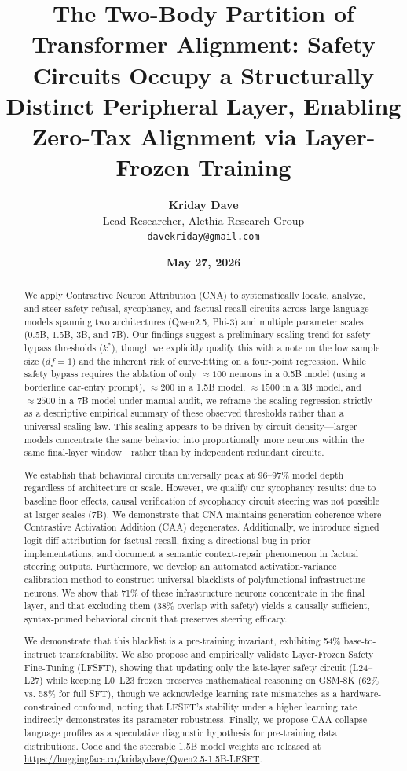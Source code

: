 \documentclass[11pt]{article}
\title{\textbf{The Two-Body Partition of Transformer Alignment: Safety Circuits Occupy a Structurally Distinct Peripheral Layer, Enabling Zero-Tax Alignment via Layer-Frozen Training}}
\author{
  \textbf{Kriday Dave} \\
  Lead Researcher, Alethia Research Group \\
  \texttt{davekriday@gmail.com}
}
\date{\textbf{May 27, 2026}}
\begin{document}
\maketitle

\begin{abstract}
We apply Contrastive Neuron Attribution (CNA) to systematically locate, analyze, and steer safety refusal, sycophancy, and factual recall circuits across large language models spanning two architectures (Qwen2.5, Phi-3) and multiple parameter scales (0.5B, 1.5B, 3B, and 7B). Our findings suggest a preliminary scaling trend for safety bypass thresholds ($k^*$), though we explicitly qualify this with a note on the low sample size ($df=1$) and the inherent risk of curve-fitting on a four-point regression. While safety bypass requires the ablation of only $\approx 100$ neurons in a 0.5B model (using a borderline car-entry prompt), $\approx 200$ in a 1.5B model, $\approx 1500$ in a 3B model, and $\approx 2500$ in a 7B model under manual audit, we reframe the scaling regression strictly as a descriptive empirical summary of these observed thresholds rather than a universal scaling law. This scaling appears to be driven by circuit density---larger models concentrate the same behavior into proportionally more neurons within the same final-layer window---rather than by independent redundant circuits. 

We establish that behavioral circuits universally peak at 96--97\% model depth regardless of architecture or scale. However, we qualify our sycophancy results: due to baseline floor effects, causal verification of sycophancy circuit steering was not possible at larger scales (7B). We demonstrate that CNA maintains generation coherence where Contrastive Activation Addition (CAA) degenerates. Additionally, we introduce signed logit-diff attribution for factual recall, fixing a directional bug in prior implementations, and document a semantic context-repair phenomenon in factual steering outputs. Furthermore, we develop an automated activation-variance calibration method to construct universal blacklists of polyfunctional infrastructure neurons. We show that 71\% of these infrastructure neurons concentrate in the final layer, and that excluding them (38\% overlap with safety) yields a causally sufficient, syntax-pruned behavioral circuit that preserves steering efficacy. 

We demonstrate that this blacklist is a pre-training invariant, exhibiting 54\% base-to-instruct transferability. We also propose and empirically validate Layer-Frozen Safety Fine-Tuning (LFSFT), showing that updating only the late-layer safety circuit (L24--L27) while keeping L0--L23 frozen preserves mathematical reasoning on GSM-8K (62\% vs. 58\% for full SFT), though we acknowledge learning rate mismatches as a hardware-constrained confound, noting that LFSFT's stability under a higher learning rate indirectly demonstrates its parameter robustness. Finally, we propose CAA collapse language profiles as a speculative diagnostic hypothesis for pre-training data distributions. Code and the steerable 1.5B model weights are released at \url{https://huggingface.co/kridaydave/Qwen2.5-1.5B-LFSFT}.
\end{abstract}
\end{document}
